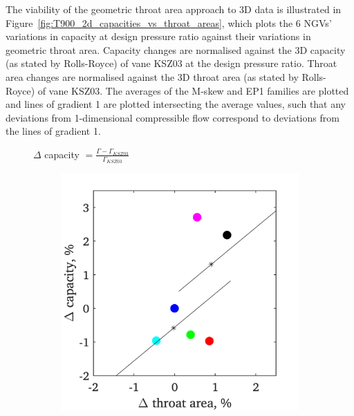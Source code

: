 \documentclass[a4paper, 11pt, oneside]{report}
\begin{document}
The viability of the geometric throat area approach to 3D data is illustrated in Figure~\ref{fig:T900_2d_capacities_vs_throat_areas}, which plots the 6 NGVs' variations in capacity at design pressure ratio against their variations in geometric throat area. Capacity changes are normalised against the 3D capacity (as stated by Rolls-Royce) of vane KSZ03 at the design pressure ratio. Throat area changes are normalised against the 3D throat area (as stated by Rolls-Royce) of vane KSZ03. The averages of the M-skew and EP1 families are plotted and lines of gradient 1 are plotted intersecting the average values, such that any deviations from 1-dimensional compressible flow correspond to deviations from the lines of gradient 1.

\begin{figure}[H]
	\centering
	$\Delta$ capacity $= \frac{\Gamma - \Gamma_{KSZ03}}{\Gamma_{KSZ03}}$
	\hspace{0.45cm}
	\begin{subfigure}{.45\textwidth}
		\centering
		\includegraphics[width=\linewidth]{figs/T900_3d_capacities_vs_throat_areas.png}
	\end{subfigure}
	\begin{subfigure}{.1125\textwidth}
		\centering

\end{subfigure}
\end{figure}
\end{document}
